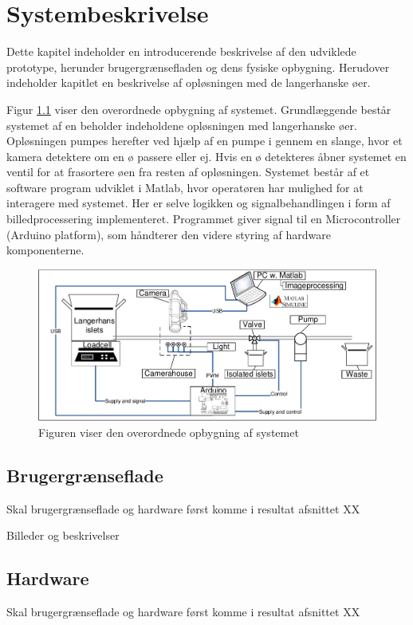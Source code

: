 \chapter{Systembeskrivelse}
Dette kapitel indeholder en introducerende beskrivelse af den udviklede prototype, herunder brugergrænsefladen og dens fysiske opbygning. Herudover indeholder kapitlet en beskrivelse af opløsningen med de langerhanske øer.

Figur \ref{fig:system} viser den overordnede opbygning af systemet. Grundlæggende består systemet af en beholder indeholdene opløsningen med langerhanske øer. Opløsningen pumpes herefter ved hjælp af en pumpe i gennem en slange, hvor et kamera detektere om en ø passere eller ej. Hvis en ø detekteres åbner systemet en ventil for at frasortere øen fra resten af opløsningen. Systemet består af et software program udviklet i Matlab, hvor operatøren har mulighed for at interagere med systemet. Her er selve logikken og signalbehandlingen i form af billedprocessering implementeret. Programmet giver signal til en Microcontroller (Arduino platform), som håndterer den videre styring af hardware komponenterne.

\begin{figure}[H]
	\centering
	\includegraphics[width=1\textwidth]{billeder/DMTS.pdf}
	\caption{Figuren viser den overordnede opbygning af systemet}
	\label{fig:system}
\end{figure}
%
%


\section{Brugergrænseflade}
Skal brugergrænseflade og hardware først komme i resultat afsnittet XX 

Billeder og beskrivelser

\section{Hardware}
Skal brugergrænseflade og hardware først komme i resultat afsnittet XX 

